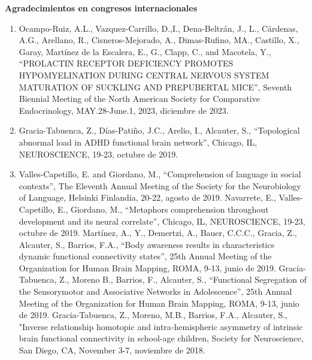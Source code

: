 \documentclass[11pt]{article}
\begin{document}
\textbf{Agradecimientos en congresos internacionales}


\begin{enumerate}
\item Ocampo-Ruiz, A.L., Vazquez-Carrillo, D.,I., Dena-Beltrán, J., L., Cárdenas, A.G., Arellano, R., Cisneros-Mejorado, A., Dimas-Rufino, 
MA., 
Castillo, X., Garay, Martínez de la Escalera, E., G., Clapp, C., and Macotela, Y., “PROLACTIN RECEPTOR DEFICIENCY PROMOTES HYPOMYELINATION 
DURING CENTRAL NERVOUS SYSTEM MATURATION OF SUCKLING AND PREPUBERTAL MICE”, Seventh Biennial Meeting of the North American Society for 
Comparative Endocrinology, MAY.28-June.1, 2023,  diciembre de 2023.

\item Gracia-Tabuenca, Z., Días-Patiño, J.C., Arelio, I., Alcauter, S., “Topological abnormal load in ADHD functional brain network”, Chicago, 
IL, 
NEUROSCIENCE, 19-23,  octubre de 2019.

\item Valles-Capetillo, E. and Giordano, M., “Comprehension of language in social contexts”, The Eleventh Annual Meeting of the Society for 
the 
Neurobiology of Language, Helsinki Finlandia, 20-22,  agosto de 2019.
Navarrete, E., Valles-Capetillo, E., Giordano, M., “Metaphors comprehension throughout development and its neural correlate”, Chicago, IL, 
NEUROSCIENCE, 19-23,  octubre de 2019.
Martínez, A., Y., Demertzi, A., Bauer, C.C.C., Gracia, Z., Alcauter, S., Barrios, F.A., “Body awareness results in characteristics dynamic 
functional connectivity states”, 25th Annual Meeting of the Organization for Human Brain Mapping, ROMA, 9-13,  junio de 2019.
Gracia-Tabuenca, Z., Moreno B., Barrios, F., Alcauter, S., “Functional Segregation of the Sensorymotor and Associative Networks in 
Adolescence”, 25th Annual Meeting of the Organization for Human Brain Mapping, ROMA, 9-13,  junio de 2019.
Gracia-Tabuenca, Z., Moreno, M.B., Barrios, F.A., Alcauter, S., "Inverse relationship homotopic and intra-hemispheric asymmetry of intrinsic 
brain functional connectivity in school-age children, Society for Neuroscience, San Diego, CA, November 3-7,  noviembre de 2018.


\end{enumerate}
\end{document}
